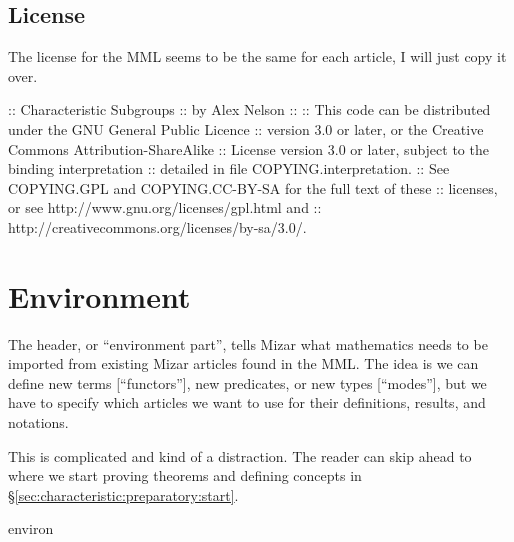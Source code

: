 \nwendcode{}\nwdocspar

\subsection*{License}
The license for the MML seems to be the same for each article, I will
just copy it over.

\nwenddocs{}\endmoddef\nwstartdeflinemarkup{}\nwenddeflinemarkup
:: Characteristic Subgroups
::  by Alex Nelson
::
:: This code can be distributed under the GNU General Public Licence
:: version 3.0 or later, or the Creative Commons Attribution-ShareAlike
:: License version 3.0 or later, subject to the binding interpretation
:: detailed in file COPYING.interpretation.
:: See COPYING.GPL and COPYING.CC-BY-SA for the full text of these
:: licenses, or see http://www.gnu.org/licenses/gpl.html and
:: http://creativecommons.org/licenses/by-sa/3.0/.

\nwendcode{}\nwdocspar
\nwenddocs{}%
\section{Environment}


The header, or ``environment part'', tells Mizar what mathematics needs
to be imported from existing Mizar articles found in the MML. The idea
is we can define new terms [``functors''], new predicates, or new types
[``modes''], but we have to specify which articles we want to use for
their definitions, results, and notations.

This is complicated and kind of a distraction. The reader can skip ahead
to where we start proving theorems and defining concepts in
\S\ref{sec:characteristic:preparatory:start}.

\nwenddocs{}\endmoddef\nwstartdeflinemarkup{}\nwenddeflinemarkup
environ

